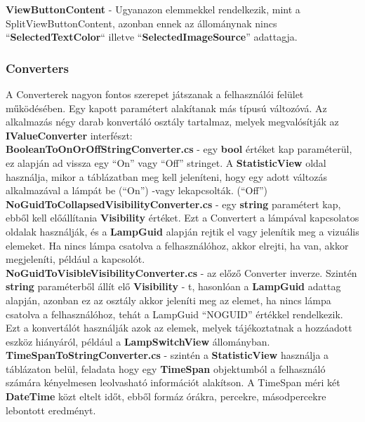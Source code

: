 \documentclass[a4paper,12pt]{report}
\begin{document}
    \textbf{ViewButtonContent} - Ugyanazon elemmekkel rendelkezik, mint a SplitViewButtonContent, azonban ennek az állománynak nincs
    ``\textbf{SelectedTextColor}`` illetve ``\textbf{SelectedImageSource}'' adattagja.

\subsubsection{Converters}
    A Converterek nagyon fontos szerepet játszanak a felhasználói felület működésében. Egy kapott paramétert alakítanak más típusú
    változóvá. Az alkalmazás négy darab konvertáló osztály tartalmaz, melyek megvalósítják az \textbf{IValueConverter} interfészt:\\

    \textbf{BooleanToOnOrOffStringConverter.cs} - egy \textbf{bool} értéket kap paraméterül, ez alapján ad vissza egy ``On'' vagy
    ``Off'' stringet. A \textbf{StatisticView} oldal használja, mikor a táblázatban meg kell jeleníteni, hogy egy adott változás
    alkalmazával a lámpát be (``On'')  -vagy lekapcsolták. (``Off'')\\

    \textbf{NoGuidToCollapsedVisibilityConverter.cs} - egy \textbf{string} paramétert kap, ebből kell előállítania \textbf{Visibility} értéket.
    Ezt a Convertert a lámpával kapcsolatos oldalak használják, és a \textbf{LampGuid} alapján rejtik el vagy jelenítik meg
    a vizuális elemeket. Ha nincs lámpa csatolva a felhasználóhoz, akkor elrejti, ha van, akkor megjeleníti, például a kapcsolót.\\

    \textbf{NoGuidToVisibleVisibilityConverter.cs} - az előző Converter inverze. Szintén \textbf{string} paraméterből állít elő
    \textbf{Visibility} - t, hasonlóan a \textbf{LampGuid} adattag alapján, azonban ez az osztály akkor jeleníti meg az elemet,
    ha nincs lámpa csatolva a felhasználóhoz, tehát a LampGuid ``NOGUID'' értékkel rendelkezik. Ezt a konvertálót használják azok az
    elemek, melyek tájékoztatnak a hozzáadott eszköz hiányáról, például a \textbf{LampSwitchView} állományban.\\

    \textbf{TimeSpanToStringConverter.cs} - szintén a \textbf{StatisticView} használja a táblázaton belül, feladata hogy egy \textbf{TimeSpan}
    objektumból a felhasználó számára kényelmesen leolvasható információt alakítson. A TimeSpan méri két \textbf{DateTime} közt eltelt
    időt, ebből formáz órákra, percekre, másodpercekre lebontott eredményt.
\end{document}
